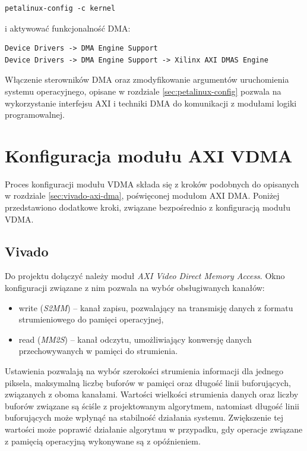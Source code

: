 \begin{lstlisting}[breaklines]
petalinux-config -c kernel
\end{lstlisting}

i aktywować funkcjonalność DMA:

\begin{lstlisting}[breaklines]
Device Drivers -> DMA Engine Support
Device Drivers -> DMA Engine Support -> Xilinx AXI DMAS Engine
\end{lstlisting}

Włączenie sterowników DMA oraz zmodyfikowanie argumentów uruchomienia systemu operacyjnego, opisane w rozdziale \ref{sec:petalinux-config} pozwala na wykorzystanie interfejsu AXI i techniki DMA do komunikacji z modułami logiki programowalnej.

\section{Konfiguracja modułu AXI VDMA}
\label{sec:vivado-axi-vdma}

Proces konfiguracji modułu VDMA składa się z kroków podobnych do opisanych w rozdziale \ref{sec:vivado-axi-dma}, poświęconej modułom AXI DMA. Poniżej przedstawiono dodatkowe kroki, związane bezpośrednio z konfiguracją modułu VDMA. %

\subsection{Vivado}
Do projektu dołączyć należy moduł \textit{AXI Video Direct Memory Access}. 
Okno konfiguracji związane z nim pozwala na wybór obsługiwanych kanałów:
\begin{itemize}
	\item write (\emph{S2MM}) -- kanał zapisu, pozwalający na transmisję danych z formatu strumieniowego do pamięci operacyjnej,
	\item read (\emph{MM2S}) -- kanał odczytu, umożliwiający konwersję danych przechowywanych w pamięci do strumienia.
\end{itemize}

Ustawienia pozwalają na wybór szerokości strumienia informacji dla jednego piksela, maksymalną liczbę buforów w pamięci oraz długość linii buforujących, związanych z oboma kanałami.
Wartości wielkości strumienia danych oraz liczby buforów związane są ściśle z projektowanym algorytmem, natomiast długość linii buforujących może wpłynąć na stabilność działania systemu. 
Zwiększenie tej wartości może poprawić działanie algorytmu w przypadku, gdy operacje związane z pamięcią operacyjną wykonywane są z opóźnieniem.

